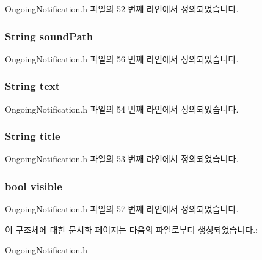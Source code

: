 Ongoing\-Notification.\-h 파일의 52 번째 라인에서 정의되었습니다.

\hypertarget{struct__OngoingNotificationExtend_ac2d6721b778cd06197fc40a5595c54e1}{
\subsubsection[{sound\-Path}]{\setlength{\rightskip}{0pt plus 5cm}String sound\-Path}}\label{struct__OngoingNotificationExtend_ac2d6721b778cd06197fc40a5595c54e1}


Ongoing\-Notification.\-h 파일의 56 번째 라인에서 정의되었습니다.

\hypertarget{struct__OngoingNotificationExtend_a685ed5195435d2b3e75433f46aec6e1e}{
\subsubsection[{text}]{\setlength{\rightskip}{0pt plus 5cm}String text}}\label{struct__OngoingNotificationExtend_a685ed5195435d2b3e75433f46aec6e1e}


Ongoing\-Notification.\-h 파일의 54 번째 라인에서 정의되었습니다.

\hypertarget{struct__OngoingNotificationExtend_a499aeec850a240ae1aecd939c5043590}{
\subsubsection[{title}]{\setlength{\rightskip}{0pt plus 5cm}String title}}\label{struct__OngoingNotificationExtend_a499aeec850a240ae1aecd939c5043590}


Ongoing\-Notification.\-h 파일의 53 번째 라인에서 정의되었습니다.

\hypertarget{struct__OngoingNotificationExtend_aa54a57ae048476d840caf6d4d2c47aa3}{
\subsubsection[{visible}]{\setlength{\rightskip}{0pt plus 5cm}bool visible}}\label{struct__OngoingNotificationExtend_aa54a57ae048476d840caf6d4d2c47aa3}


Ongoing\-Notification.\-h 파일의 57 번째 라인에서 정의되었습니다.



이 구조체에 대한 문서화 페이지는 다음의 파일로부터 생성되었습니다.\-:\begin{DoxyCompactItemize}
\item 
Ongoing\-Notification.\-h\end{DoxyCompactItemize}

